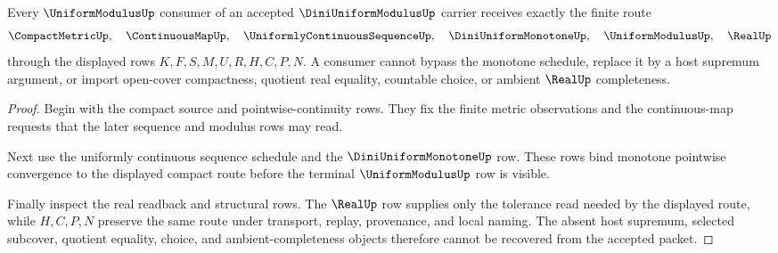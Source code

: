 \begin{theorem}
\label{thm:dini-uniform-modulus-monotone-uniform-route}
Every $\UniformModulusUp$ consumer of an accepted $\DiniUniformModulusUp$ carrier receives exactly the finite route
$$
\CompactMetricUp,\quad \ContinuousMapUp,\quad \UniformlyContinuousSequenceUp,\quad \DiniUniformMonotoneUp,\quad \UniformModulusUp,\quad \RealUp
$$
through the displayed rows $K,F,S,M,U,R,H,C,P,N$. A consumer cannot bypass the monotone schedule, replace it by a host supremum argument, or import open-cover compactness, quotient real equality, countable choice, or ambient $\RealUp$ completeness.
\end{theorem}
\begin{proof}
Begin with the compact source and pointwise-continuity rows. They fix the finite metric observations and the continuous-map requests that the later sequence and modulus rows may read.

Next use the uniformly continuous sequence schedule and the $\DiniUniformMonotoneUp$ row. These rows bind monotone pointwise convergence to the displayed compact route before the terminal $\UniformModulusUp$ row is visible.

Finally inspect the real readback and structural rows. The $\RealUp$ row supplies only the tolerance read needed by the displayed route, while $H,C,P,N$ preserve the same route under transport, replay, provenance, and local naming. The absent host supremum, selected subcover, quotient equality, choice, and ambient-completeness objects therefore cannot be recovered from the accepted packet.
\end{proof}




